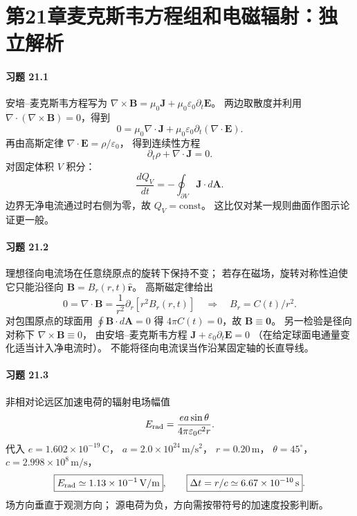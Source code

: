 \section*{第21章\quad 麦克斯韦方程组和电磁辐射：独立解析}

\paragraph{习题 21.1}
安培--麦克斯韦方程写为
\(\nabla\times\boldsymbol B
=\mu_0\boldsymbol J+\mu_0\varepsilon_0\partial_t\boldsymbol E\)。
两边取散度并利用
\(\nabla\cdot(\nabla\times\boldsymbol B)=0\)，得到
\[
0=\mu_0\nabla\cdot\boldsymbol J+
\mu_0\varepsilon_0\partial_t(\nabla\cdot\boldsymbol E).
\]
再由高斯定律
\(\nabla\cdot\boldsymbol E=\rho/\varepsilon_0\)，
得到连续性方程
\[
\boxed{\partial_t\rho+\nabla\cdot\boldsymbol J=0}.
\]
对固定体积 \(V\) 积分：
\[
\frac{dQ_V}{dt}=-\oint_{\partial V}\boldsymbol J\cdot d\boldsymbol A.
\]
边界无净电流通过时右侧为零，故
\(\boxed{Q_V=\mathrm{const}}\)。
这比仅对某一规则曲面作图示论证更一般。

\paragraph{习题 21.2}
理想径向电流场在任意绕原点的旋转下保持不变；
若存在磁场，旋转对称性迫使它只能沿径向
\(\boldsymbol B=B_r(r,t)\hat{\boldsymbol r}\)。
高斯磁定律给出
\[
0=\nabla\cdot\boldsymbol B
=\frac1{r^2}\partial_r[r^2B_r(r,t)]
\quad\Longrightarrow\quad
B_r=C(t)/r^2.
\]
对包围原点的球面用
\(\oint\boldsymbol B\cdot d\boldsymbol A=0\) 得
\(4\pi C(t)=0\)，故
\(\boxed{\boldsymbol B\equiv\boldsymbol0}\)。
另一检验是径向对称下
\(\nabla\times\boldsymbol B\equiv0\)，
由安培--麦克斯韦方程
\(\boldsymbol J+\varepsilon_0\partial_t\boldsymbol E=0\)
（在给定球面电通量变化适当计入净电流时）。
不能将径向电流误当作沿某固定轴的长直导线。

\paragraph{习题 21.3}
非相对论远区加速电荷的辐射电场幅值
\[
E_{\rm rad}=\frac{e a\sin\theta}
{4\pi\varepsilon_0c^2r}.
\]
代入 \(e=1.602\times10^{-19}\,\mathrm C\)，
\(a=2.0\times10^{24}\,\mathrm{m/s^2}\)，
\(r=0.20\,\mathrm m\)，
\(\theta=45^\circ\)，\(c=2.998\times10^8\,\mathrm{m/s}\)，
\[
\boxed{E_{\rm rad}\simeq1.13\times10^{-1}\,\mathrm{V/m}},
\qquad
\boxed{\Delta t=r/c\simeq6.67\times10^{-10}\,\mathrm s}.
\]
场方向垂直于观测方向；
源电荷为负，方向需按带符号的加速度投影判断。

